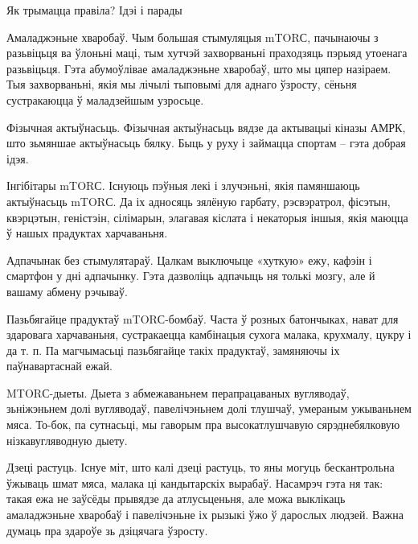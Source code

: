 Як трымацца правіла? Ідэі і парады

Амаладжэньне хваробаў.
Чым большая стымуляцыя mTORС, пачынаючы з разьвіцьця ва ўлоньні маці, тым хутчэй захворваньні праходзяць пэрыяд утоенага разьвіцьця. Гэта абумоўлівае амаладжэньне хваробаў, што мы цяпер назіраем. Тыя захворваньні, якія мы лічылі тыповымі для аднаго ўзросту, сёньня сустракаюцца ў маладзейшым узросьце.

Фізычная актыўнасьць.
Фізычная актыўнасьць вядзе да актывацыі кіназы АМРК, што зьмяншае актыўнасьць бялку. Быць у руху і займацца спортам – гэта добрая ідэя.

Інгібітары mTORС.
Існуюць пэўныя лекі і злучэньні, якія памяншаюць актыўнасьць mTORС. Да іх адносяць зялёную гарбату, рэсвэратрол, фісэтын, квэрцэтын, геністэін, сілімарын, элагавая кіслата і некаторыя іншыя, якія маюцца ў нашых прадуктах харчаваньня.

Адпачынак без стымулятараў.
Цалкам выключыце «хуткую» ежу, кафэін і смартфон у дні адпачынку. Гэта дазволіць адпачыць ня толькі мозгу, але й вашаму абмену рэчываў.

Пазьбягайце прадуктаў mTORС-бомбаў.
Часта ў розных батончыках, нават для здаровага харчаваньня, сустракаецца камбінацыя сухога малака, крухмалу, цукру і да т. п. Па магчымасьці пазьбягайце такіх прадуктаў, замяняючы іх паўнавартаснай ежай.

MTORС-дыеты.
Дыета з абмежаваньнем перапрацаваных вугляводаў, зьніжэньнем долі вугляводаў, павелічэньнем долі тлушчаў, умераным ужываньнем мяса. То-бок, па сутнасьці, мы гаворым пра высокатлушчавую сярэднебялковую нізкавугляводную дыету.

Дзеці растуць.
Існуе міт, што калі дзеці растуць, то яны могуць бескантрольна ўжываць шмат мяса, малака ці кандытарскіх вырабаў. Насамрэч гэта ня так: такая ежа не заўсёды прывядзе да атлусьценьня, але можа выклікаць амаладжэньне хваробаў і павелічэньне іх рызыкі ўжо ў дарослых людзей. Важна думаць пра здароўе зь дзіцячага ўзросту.
